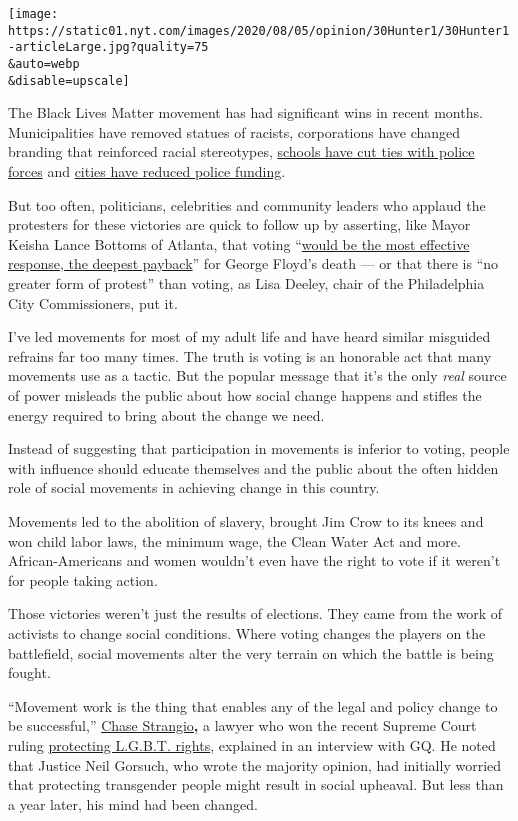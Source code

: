 \texttt{[image: https://static01.nyt.com/images/2020/08/05/opinion/30Hunter1/30Hunter1-articleLarge.jpg?quality=75\\\&auto=webp\\\&disable=upscale]}

The Black Lives Matter movement has had significant wins in recent
months. Municipalities have removed statues of racists, corporations
have changed branding that reinforced racial stereotypes,
\href{https://www.nytimes.com/2020/06/12/us/schools-police-resource-officers.html}{schools
have cut ties with police forces} and
\href{https://www.nytimes.com/2020/06/08/us/unrest-defund-police.html}{cities
have reduced police funding}.

But too often, politicians, celebrities and community leaders who
applaud the protesters for these victories are quick to follow up by
asserting, like Mayor Keisha Lance Bottoms of Atlanta, that voting
``\href{https://www.nytimes.com/2020/06/03/opinion/police-protests-atlanta-keisha-bottoms.html}{would
be the most effective response, the deepest payback}'' for George
Floyd's death --- or that there is ``no greater form of protest'' than
voting, as Lisa Deeley, chair of the Philadelphia City Commissioners,
put it.

I've led movements for most of my adult life and have heard similar
misguided refrains far too many times. The truth is voting is an
honorable act that many movements use as a tactic. But the popular
message that it's the only \emph{real} source of power misleads the
public about how social change happens and stifles the energy required
to bring about the change we need.

Instead of suggesting that participation in movements is inferior to
voting, people with influence should educate themselves and the public
about the often hidden role of social movements in achieving change in
this country.

Movements led to the abolition of slavery, brought Jim Crow to its knees
and won child labor laws, the minimum wage, the Clean Water Act and
more. African-Americans and women wouldn't even have the right to vote
if it weren't for people taking action.

Those victories weren't just the results of elections. They came from
the work of activists to change social conditions. Where voting changes
the players on the battlefield, social movements alter the very terrain
on which the battle is being fought.

``Movement work is the thing that enables any of the legal and policy
change to be successful,''
\href{https://www.gq.com/story/chase-strangio-aclu-lgbtq-legal-victory}{Chase
Strangio}\textbf{,} a lawyer who won the recent Supreme Court ruling
\href{https://www.nytimes.com/2020/06/15/us/gay-transgender-workers-supreme-court.html}{protecting
L.G.B.T. rights}, explained in an interview with GQ. He noted that
Justice Neil Gorsuch, who wrote the majority opinion, had initially
worried that protecting transgender people might result in social
upheaval. But less than a year later, his mind had been changed.

